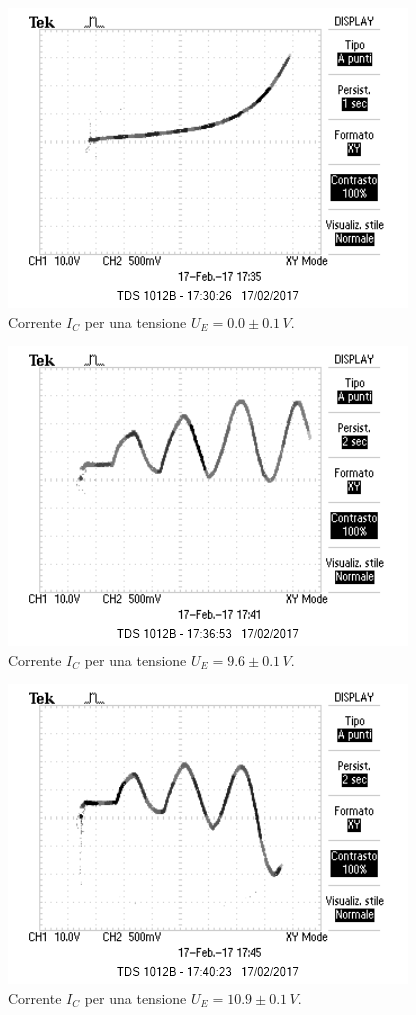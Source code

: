 \documentclass[10pt,a4paper]{article}
\begin{document}
\begin{figure}[!htb]
  \centering
  \includegraphics[scale=1.0]{uezero.png}
\caption{Corrente $I_C$ per una tensione $U_E = 0.0\pm0.1 \, V$.}
\label{grafico1}
\end{figure}

\begin{figure}[!htb]
  \centering
  \includegraphics[scale=1.0]{ue9punto680volts.png}
\caption{Corrente $I_C$ per una tensione $U_E = 9.6 \pm 0.1\, V$.}
\label{grafico2}
\end{figure}


\begin{figure}[!htb]
  \centering
  \includegraphics[scale=1.0]{ue10punto970volts.png}
\caption{Corrente $I_C$ per una tensione $U_E = 10.9 \pm 0.1\, V$.}
\label{grafico3}
\end{figure}
\end{document}
